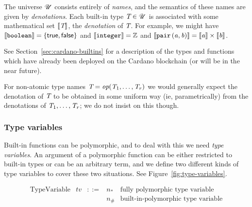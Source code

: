 

The universe $\mathscr{U}$ consists entirely of \textit{names}, and the semantics of
these names are given by \textit{denotations}. Each built-in type $\textit{T} \in \mathscr{U}$
is associated with some mathematical set $\llbracket\mathit{\textit{T}}\rrbracket$, the \textit{denotation}
of $\textit{T}$. For example, we might have $\llbracket\mathit{\texttt{boolean}}\rrbracket=
\{\mathsf{true}, \mathsf{false}\}$ and $\llbracket\mathit{\texttt{integer}}\rrbracket = \mathbb{Z}$
and $\llbracket\mathit{\mathtt{pair}\,\mathtt{(}a\mathtt{,}\,b\mathtt{)}}\rrbracket = \llbracket\mathit{a}\rrbracket \times \llbracket\mathit{b}\rrbracket$.

See Section~\ref{sec:cardano-builtins}
for a description of the types and functions which have already been deployed on
the Cardano blockchain (or will be in the near future).

For non-atomic type names $\textit{T} = \textit{op}(\textit{T}_1, \ldots, \textit{T}_r)$ we would generally
expect the denotation of $\textit{T}$ to be obtained in some uniform way (ie,
parametrically) from the denotations of $\textit{T}_1, \ldots, \textit{T}_r$; we do not insist
on this though.

\newcommand{\tv}{\ensuremath{\textit{tv}}}

\subsubsection{Type variables}
\label{sec:type-variables}
Built-in functions can be polymorphic, and to deal with this we need
\textit{type variables}.  An argument of a polymorphic function can be either
restricted to built-in types or can be an arbitrary term, and we define two
different kinds of type variables to cover these two situations.  See
Figure~\ref{fig:type-variables}.

\begin{minipage}{\linewidth}
  \centering
      \[\begin{array}{lrclr}
        \textrm{TypeVariable}    & \tv & ::= & n_{*} & \textrm{fully polymorphic type variable}\\
                                 &           &      & n_{\#} & \textrm{built-in-polymorphic type variable}\\
    \end{array}\]
    \label{fig:type-variables}
\end{minipage}

